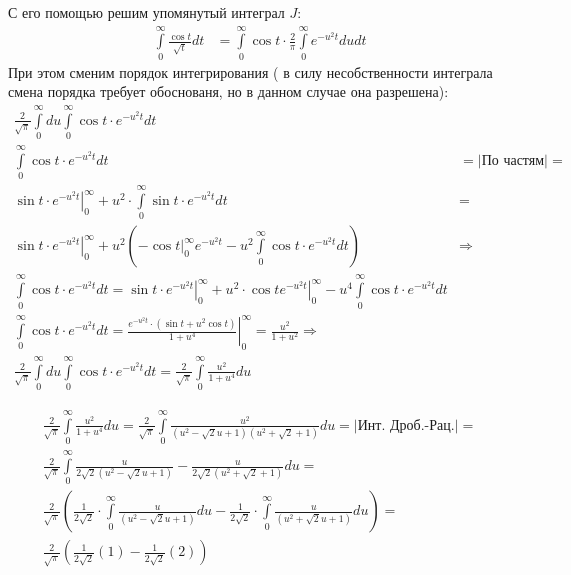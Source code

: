 \documentclass[12pt, a4paper]{article}
\begin{document}
С его помощью решим упомянутый интеграл $J$:
\begin{equation*}
\begin{aligned}
\int\limits_0^{\infty} \frac{\cos{t}}{\sqrt{t}} dt &= \int\limits_0^{\infty} \cos{t} \cdot \frac{2}{\pi} \int\limits_0^{\infty} e^{-u^2 t}du dt
\end{aligned}
\end{equation*}
При этом сменим порядок интегрирования ( в силу несобственности интеграла смена порядка требует обоснованя, но в данном случае она разрешена):
\begin{equation*}
\begin{aligned}
\frac{2}{\sqrt{\pi}} \int\limits_0^{\infty} du  \int\limits_0^{\infty} \cos{t} \cdot  e^{-u^2 t} dt \\
\int\limits_0^{\infty} \cos{t} \cdot  e^{-u^2 t} dt &= |\text{По частям}| =\\
\left. \sin{t} \cdot e^{-u^2 t} \right|_0^{\infty} + u^2 \cdot \int\limits_0^{\infty} \sin{t} \cdot  e^{-u^2 t} dt &=\\
 \left.\sin{t} \cdot e^{-u^2 t} \right|_0^{\infty} + u^2 \left( \left. -\cos{t} \right|_0^{\infty} e^{-u^2 t} - u^2\int\limits_0^{\infty} \cos{t} \cdot  e^{-u^2 t} dt \right) & \Rightarrow\\
\int\limits_0^{\infty} \cos{t} \cdot  e^{-u^2 t} dt = \left. \sin{t} \cdot e^{-u^2 t} \right|_0^{\infty} + \left. u^2 \cdot \cos{t} e^{-u^2 t} \right|_0^{\infty} - u^4 \int\limits_0^{\infty} \cos{t}\cdot  e^{-u^2 t} dt \\
\int\limits_0^{\infty} \cos{t}\cdot  e^{-u^2 t} dt =\left. \frac{e^{-u^2 t}\cdot \left(\sin{t} + u^2 \cos{t} \right)}{1 + u^4} \right|_0^{\infty} = \frac{u^2}{1+u^2} \Rightarrow \\
\frac{2}{\sqrt{\pi}} \int\limits_0^{\infty} du  \int\limits_0^{\infty} \cos{t}\cdot  e^{-u^2 t} dt = \frac{2}{\sqrt{\pi}} \int\limits_0^{\infty} \frac{u^2}{1+u^4} du 
\end{aligned}
\end{equation*}

\begin{equation*}
\begin{aligned}
\frac{2}{\sqrt{\pi}} \int\limits_0^{\infty} \frac{u^2}{1+u^4} du = \frac{2}{\sqrt{\pi}} \int\limits_0^{\infty} \frac{u^2}{ (u^2-\sqrt{2}u+1) (u^2+\sqrt{2}+1) } du = |\text{Инт. Дроб.-Рац.}| =\\
\frac{2}{\sqrt{\pi}} \int\limits_0^{\infty} \frac{u}{ 2\sqrt{2}(u^2-\sqrt{2}u+1)} - \frac{u}{2\sqrt{2}(u^2+\sqrt{2}+1) } du =\\
\frac{2}{\sqrt{\pi}} \left( \frac{1}{2\sqrt{2}}\cdot \int\limits_0^{\infty} \frac{u}{(u^2-\sqrt{2}u+1)} du - \frac{1}{2\sqrt{2}}\cdot \int\limits_0^{\infty} \frac{u}{(u^2+\sqrt{2}u+1)} du \right) =\\
\frac{2}{\sqrt{\pi}} \left( \frac{1}{2\sqrt{2}} (1) - \frac{1}{2\sqrt{2}} (2) \right)
\end{aligned}
\end{equation*}
\end{document}

